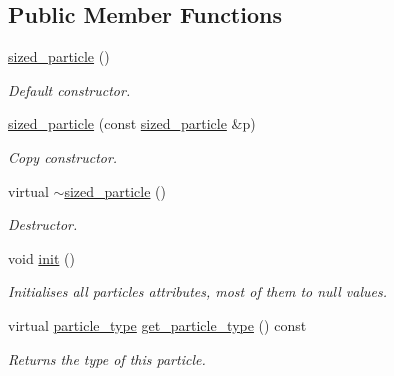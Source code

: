\subsection*{Public Member Functions}
\begin{DoxyCompactItemize}
\item 
\mbox{\label{classphysim_1_1particles_1_1sized__particle_a17d839e98133f850e0830195452ae4cc}} 
\hyperlink{classphysim_1_1particles_1_1sized__particle_a17d839e98133f850e0830195452ae4cc}{sized\+\_\+particle} ()
\begin{DoxyCompactList}\small\item\em Default constructor. \end{DoxyCompactList}\item 
\mbox{\label{classphysim_1_1particles_1_1sized__particle_abd73ec6598e9595d6c7b07c04cf6e808}} 
\hyperlink{classphysim_1_1particles_1_1sized__particle_abd73ec6598e9595d6c7b07c04cf6e808}{sized\+\_\+particle} (const \hyperlink{classphysim_1_1particles_1_1sized__particle}{sized\+\_\+particle} \&p)
\begin{DoxyCompactList}\small\item\em Copy constructor. \end{DoxyCompactList}\item 
\mbox{\label{classphysim_1_1particles_1_1sized__particle_a2324f58dc1cab36e8fe55080bc5567f3}} 
virtual \hyperlink{classphysim_1_1particles_1_1sized__particle_a2324f58dc1cab36e8fe55080bc5567f3}{$\sim$sized\+\_\+particle} ()
\begin{DoxyCompactList}\small\item\em Destructor. \end{DoxyCompactList}\item 
void \hyperlink{classphysim_1_1particles_1_1sized__particle_a63de84961417c1522c0ca576697cd972}{init} ()
\begin{DoxyCompactList}\small\item\em Initialises all particle\textquotesingle{}s attributes, most of them to null values. \end{DoxyCompactList}\item 
\mbox{\label{classphysim_1_1particles_1_1sized__particle_a03cd08b0e1c6156fa4fdf1cde2618f4b}} 
virtual \hyperlink{namespacephysim_1_1particles_a068e6cda6626fbd381c07a9835425b08}{particle\+\_\+type} \hyperlink{classphysim_1_1particles_1_1sized__particle_a03cd08b0e1c6156fa4fdf1cde2618f4b}{get\+\_\+particle\+\_\+type} () const
\begin{DoxyCompactList}\small\item\em Returns the type of this particle. \end{DoxyCompactList}\end{DoxyCompactItemize}
